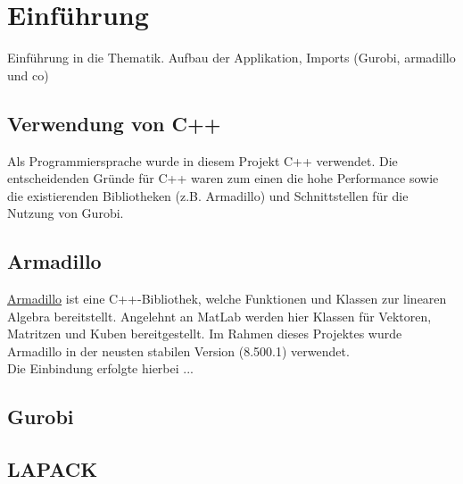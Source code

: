 \section{Einführung}
Einführung in die Thematik. Aufbau der Applikation, Imports (Gurobi, armadillo und co)
\subsection{Verwendung von C++}
Als Programmiersprache wurde in diesem Projekt C++ verwendet. Die entscheidenden Gründe für C++ waren zum einen die hohe Performance sowie die existierenden Bibliotheken (z.B. Armadillo) und Schnittstellen für die Nutzung von Gurobi.  
\subsection{Armadillo}
\href{http://arma.sourceforge.net/}{Armadillo} ist eine C++-Bibliothek, welche Funktionen und Klassen zur linearen Algebra bereitstellt. Angelehnt an MatLab werden hier Klassen für Vektoren, Matritzen und Kuben bereitgestellt.
Im Rahmen dieses Projektes wurde Armadillo in der neusten stabilen Version (8.500.1) verwendet. \\
Die Einbindung erfolgte hierbei ...
\subsection{Gurobi}
\subsection{LAPACK}